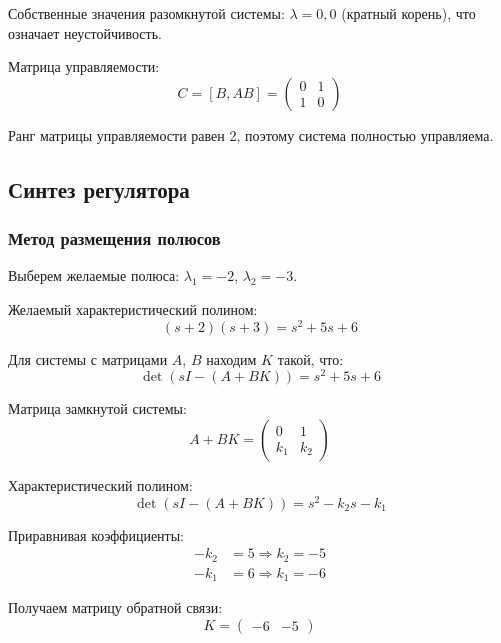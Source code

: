 Собственные значения разомкнутой системы: $\lambda = 0, 0$ (кратный корень), что означает неустойчивость.

Матрица управляемости:
\begin{equation}
C = [B, AB] = \begin{pmatrix} 0 & 1 \\ 1 & 0 \end{pmatrix}
\end{equation}

Ранг матрицы управляемости равен 2, поэтому система полностью управляема.

\subsection{Синтез регулятора}

\subsubsection{Метод размещения полюсов}

Выберем желаемые полюса: $\lambda_1 = -2$, $\lambda_2 = -3$.

Желаемый характеристический полином:
\begin{equation}
(s + 2)(s + 3) = s^2 + 5s + 6
\end{equation}

Для системы с матрицами $A$, $B$ находим $K$ такой, что:
\begin{equation}
\det(sI - (A + BK)) = s^2 + 5s + 6
\end{equation}

Матрица замкнутой системы:
\begin{equation}
A + BK = \begin{pmatrix} 0 & 1 \\ k_1 & k_2 \end{pmatrix}
\end{equation}

Характеристический полином:
\begin{equation}
\det(sI - (A + BK)) = s^2 - k_2s - k_1
\end{equation}

Приравнивая коэффициенты:
\begin{align}
-k_2 &= 5 \Rightarrow k_2 = -5 \\
-k_1 &= 6 \Rightarrow k_1 = -6
\end{align}

Получаем матрицу обратной связи:
\begin{equation}
K = \begin{pmatrix} -6 & -5 \end{pmatrix}
\end{equation}

